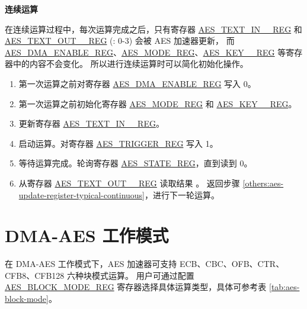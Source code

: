 \documentclass[main\_\_CN.tex]{subfiles}
\begin{document}
\textbf{连续运算}

在连续运算过程中，每次运算完成之后，只有寄存器 \hyperref[regdesc:AESTEXTINNREG]{AES\_TEXT\_IN\_\_REG} 和 \hyperref[regdesc:AESTEXTOUTNREG]{AES\_TEXT\_OUT\_\_REG} (: 0-3) 会被 AES 加速器更新，
而 \hyperref[regdesc:AESDMAENABLEREG]{AES\_DMA\_ENABLE\_REG}、\hyperref[regdesc:AESMODEREG]{AES\_MODE\_REG}、\hyperref[regdesc:AESKEYNREG]{AES\_KEY\_\_REG} 等寄存器中的内容不会变化。
所以进行连续运算时可以简化初始化操作。

\begin{enumerate}
    \item 第一次运算之前对寄存器 \hyperref[regdesc:AESDMAENABLEREG]{AES\_DMA\_ENABLE\_REG} 写入 0。
    \item 第一次运算之前初始化寄存器 \hyperref[regdesc:AESMODEREG]{AES\_MODE\_REG} 和 \hyperref[regdesc:AESKEYNREG]{AES\_KEY\_\_REG}。
    \item 更新寄存器 \hyperref[regdesc:AESTEXTINNREG]{AES\_TEXT\_IN\_\_REG}。 \label{others:aes-update-register-typical-continuous}
    \item 启动运算。对寄存器 \hyperref[regdesc:AESTRIGGERREG]{AES\_TRIGGER\_REG} 写入 1。
    \item 等待运算完成。轮询寄存器 \hyperref[regdesc:AESSTATEREG]{AES\_STATE\_REG}，直到读到 0。
    \item 从寄存器 \hyperref[regdesc:AESTEXTOUTNREG]{AES\_TEXT\_OUT\_\_REG} 读取结果 \label{read result in typical AES continuous calculation}。 返回步骤 \ref{others:aes-update-register-typical-continuous}，进行下一轮运算。
\end{enumerate}


\section{DMA-AES 工作模式}\label{sec:aes-dma-aes}

在 DMA-AES 工作模式下，AES 加速器可支持 ECB、CBC、OFB、CTR、CFB8、CFB128 六种块模式运算。
用户可通过配置 \hyperref[regdesc:AESBLOCKMODEREG]{AES\_BLOCK\_MODE\_REG} 寄存器选择具体运算类型，具体可参考表 \ref{tab:aes-block-mode}。
\end{document}
